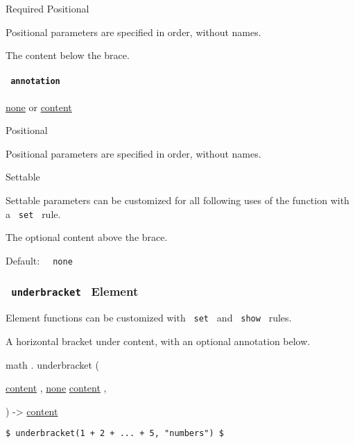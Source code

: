 {Required} {{ Positional }}

\label{functions-overbrace-body-positional-tooltip}
Positional parameters are specified in order, without names.

The content below the brace.

\paragraph{\texorpdfstring{\texttt{\ annotation\ }}{ annotation }}\label{functions-overbrace-annotation}

\href{/docs/reference/foundations/none/}{none} {or}
\href{/docs/reference/foundations/content/}{content}

{{ Positional }}

\label{functions-overbrace-annotation-positional-tooltip}
Positional parameters are specified in order, without names.

{{ Settable }}

\label{functions-overbrace-annotation-settable-tooltip}
Settable parameters can be customized for all following uses of the
function with a \texttt{\ set\ } rule.

The optional content above the brace.

Default: \texttt{\ }{\texttt{\ none\ }}\texttt{\ }

\subsubsection{\texorpdfstring{\texttt{\ underbracket\ } {{ Element
}}}{ underbracket   Element }}\label{functions-underbracket}

\label{functions-underbracket-element-tooltip}
Element functions can be customized with \texttt{\ set\ } and
\texttt{\ show\ } rules.

A horizontal bracket under content, with an optional annotation below.

math { . } { underbracket } (

{ \href{/docs/reference/foundations/content/}{content} , } {
\hyperref[functions-underbracket-parameters-annotation]{}
\href{/docs/reference/foundations/none/}{none}
\href{/docs/reference/foundations/content/}{content} , }

) -\textgreater{} \href{/docs/reference/foundations/content/}{content}

\begin{verbatim}
$ underbracket(1 + 2 + ... + 5, "numbers") $
\end{verbatim}

